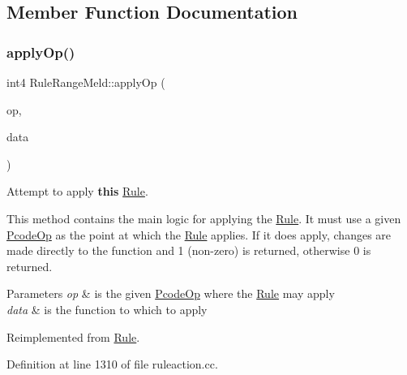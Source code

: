 \subsection{Member Function Documentation}
\mbox{\label{class_rule_range_meld_af99e831a0fd88d12ef57c0cd9fe01c1d}} 
\subsubsection{\texorpdfstring{applyOp()}{applyOp()}}
{\footnotesize\ttfamily int4 Rule\+Range\+Meld\+::apply\+Op (\begin{DoxyParamCaption}\item[{\mbox{\hyperlink{class_pcode_op}{Pcode\+Op}} $\ast$}]{op,  }\item[{\mbox{\hyperlink{class_funcdata}{Funcdata}} \&}]{data }\end{DoxyParamCaption})\hspace{0.3cm}{\ttfamily [virtual]}}



Attempt to apply {\bfseries{this}} \mbox{\hyperlink{class_rule}{Rule}}. 

This method contains the main logic for applying the \mbox{\hyperlink{class_rule}{Rule}}. It must use a given \mbox{\hyperlink{class_pcode_op}{Pcode\+Op}} as the point at which the \mbox{\hyperlink{class_rule}{Rule}} applies. If it does apply, changes are made directly to the function and 1 (non-\/zero) is returned, otherwise 0 is returned. 
\begin{DoxyParams}{Parameters}
{\em op} & is the given \mbox{\hyperlink{class_pcode_op}{Pcode\+Op}} where the \mbox{\hyperlink{class_rule}{Rule}} may apply \\
\hline
{\em data} & is the function to which to apply \\
\hline
\end{DoxyParams}


Reimplemented from \mbox{\hyperlink{class_rule_a4e3e61f066670175009f60fb9dc60848}{Rule}}.



Definition at line 1310 of file ruleaction.\+cc.

